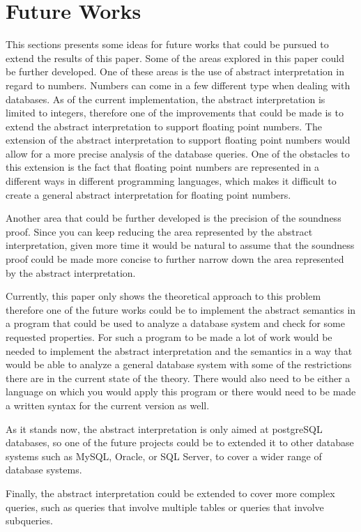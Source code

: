 \section{Future Works}\label{sec:future-works}
This sections presents some ideas for future works that could be pursued to extend the results of this paper.
Some of the areas explored in this paper could be further developed.
One of these areas is the use of abstract interpretation in regard to numbers.
Numbers can come in a few different type when dealing with databases.
As of the current implementation, the abstract interpretation is limited to integers, therefore one of the improvements that could be made is to extend the abstract interpretation to support floating point numbers.
The extension of the abstract interpretation to support floating point numbers would allow for a more precise analysis of the database queries.
One of the obstacles to this extension is the fact that floating point numbers are represented in a different ways in different programming languages, which makes it difficult to create a general abstract interpretation for floating point numbers.

Another area that could be further developed is the precision of the soundness proof.
Since you can keep reducing the area represented by the abstract interpretation, given more time it would be natural to assume that the soundness proof could be made more concise to further narrow down the area represented by the abstract interpretation.


Currently, this paper only shows the theoretical approach to this problem therefore one of the future works could be to implement the abstract semantics in a program that could be used to analyze a database system and check for some requested properties.
For such a program to be made a lot of work would be needed to implement the abstract interpretation and the semantics in a way that would be able to analyze a general database system with some of the restrictions there are in the current state of the theory.
There would also need to be either a language on which you would apply this program or there would need to be made a written syntax for the current version as well.

As it stands now, the abstract interpretation is only aimed at postgreSQL databases, so one of the future projects could be to extended it to other database systems such as MySQL, Oracle, or SQL Server, to cover a wider range of database systems.

Finally, the abstract interpretation could be extended to cover more complex queries, such as queries that involve multiple tables or queries that involve subqueries.